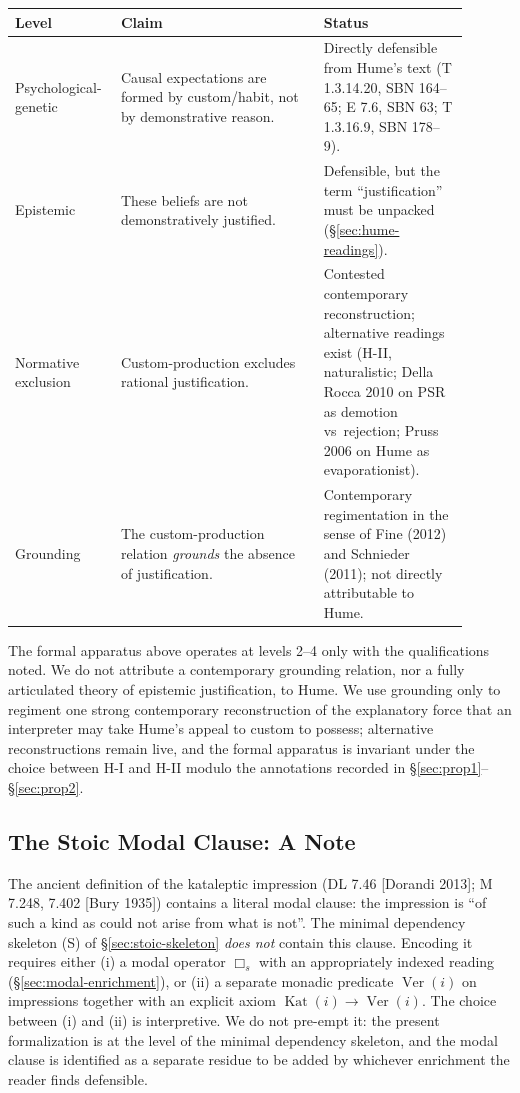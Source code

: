\begin{center}
\begin{tabular}{p{0.18\linewidth} p{0.42\linewidth} p{0.30\linewidth}}
\hline
\textbf{Level} & \textbf{Claim} & \textbf{Status} \\
\hline
Psychological-genetic &
Causal expectations are formed by custom/habit, not by demonstrative
reason. &
Directly defensible from Hume's text (T 1.3.14.20, SBN 164--65;
E 7.6, SBN 63; T 1.3.16.9, SBN 178--9). \\
Epistemic &
These beliefs are not demonstratively justified. &
Defensible, but the term ``justification'' must be unpacked
(§\ref{sec:hume-readings}). \\
Normative exclusion &
Custom-production excludes rational justification. &
Contested contemporary reconstruction; alternative readings exist
(H-II, naturalistic; Della Rocca 2010 on PSR as demotion vs\
rejection; Pruss 2006 on Hume as evaporationist). \\
Grounding &
The custom-production relation \emph{grounds} the absence of
justification. &
Contemporary regimentation in the sense of Fine (2012) and
Schnieder (2011); not directly attributable to Hume. \\
\hline
\end{tabular}
\end{center}

The formal apparatus above operates at levels 2--4 only with the
qualifications noted. We do not attribute a contemporary grounding
relation, nor a fully articulated theory of epistemic justification,
to Hume. We use grounding only to regiment one strong contemporary
reconstruction of the explanatory force that an interpreter may
take Hume's appeal to custom to possess; alternative reconstructions
remain live, and the formal apparatus is invariant under the choice
between H-I and H-II modulo the annotations recorded in
\S\ref{sec:prop1}--\S\ref{sec:prop2}.

\subsection{The Stoic Modal Clause: A Note}
\label{sec:stoic-modal-note}

The ancient definition of the kataleptic impression (DL 7.46
[Dorandi 2013]; M 7.248, 7.402 [Bury 1935]) contains a literal modal
clause: the impression is ``of such a kind as could not arise from
what is not''. The minimal dependency skeleton (S) of
\S\ref{sec:stoic-skeleton} \emph{does not} contain this clause.
Encoding it requires either (i) a modal operator $\Box_s$ with an
appropriately indexed reading (§\ref{sec:modal-enrichment}), or
(ii) a separate monadic predicate $\operatorname{Ver}(i)$ on
impressions together with an explicit axiom
$\operatorname{Kat}(i)\rightarrow\operatorname{Ver}(i)$. The choice
between (i) and (ii) is interpretive. We do not pre-empt it: the
present formalization is at the level of the minimal dependency
skeleton, and the modal clause is identified as a separate residue
to be added by whichever enrichment the reader finds defensible.

